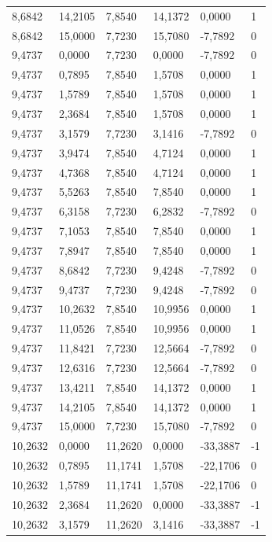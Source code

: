 \documentclass[12pt]{article}
\begin{document}
\begin{longtable}{@{}llllll@{}}
		8,6842  & 14,2105 & 7,8540  & 14,1372 & 0,0000   & 1  \\
		8,6842  & 15,0000 & 7,7230  & 15,7080 & -7,7892  & 0  \\
		9,4737  & 0,0000  & 7,7230  & 0,0000  & -7,7892  & 0  \\
		9,4737  & 0,7895  & 7,8540  & 1,5708  & 0,0000   & 1  \\
		9,4737  & 1,5789  & 7,8540  & 1,5708  & 0,0000   & 1  \\
		9,4737  & 2,3684  & 7,8540  & 1,5708  & 0,0000   & 1  \\
		9,4737  & 3,1579  & 7,7230  & 3,1416  & -7,7892  & 0  \\
		9,4737  & 3,9474  & 7,8540  & 4,7124  & 0,0000   & 1  \\
		9,4737  & 4,7368  & 7,8540  & 4,7124  & 0,0000   & 1  \\
		9,4737  & 5,5263  & 7,8540  & 7,8540  & 0,0000   & 1  \\
		9,4737  & 6,3158  & 7,7230  & 6,2832  & -7,7892  & 0  \\
		9,4737  & 7,1053  & 7,8540  & 7,8540  & 0,0000   & 1  \\
		9,4737  & 7,8947  & 7,8540  & 7,8540  & 0,0000   & 1  \\
		9,4737  & 8,6842  & 7,7230  & 9,4248  & -7,7892  & 0  \\
		9,4737  & 9,4737  & 7,7230  & 9,4248  & -7,7892  & 0  \\
		9,4737  & 10,2632 & 7,8540  & 10,9956 & 0,0000   & 1  \\
		9,4737  & 11,0526 & 7,8540  & 10,9956 & 0,0000   & 1  \\
		9,4737  & 11,8421 & 7,7230  & 12,5664 & -7,7892  & 0  \\
		9,4737  & 12,6316 & 7,7230  & 12,5664 & -7,7892  & 0  \\
		9,4737  & 13,4211 & 7,8540  & 14,1372 & 0,0000   & 1  \\
		9,4737  & 14,2105 & 7,8540  & 14,1372 & 0,0000   & 1  \\
		9,4737  & 15,0000 & 7,7230  & 15,7080 & -7,7892  & 0  \\
		10,2632 & 0,0000  & 11,2620 & 0,0000  & -33,3887 & -1 \\
		10,2632 & 0,7895  & 11,1741 & 1,5708  & -22,1706 & 0  \\
		10,2632 & 1,5789  & 11,1741 & 1,5708  & -22,1706 & 0  \\
		10,2632 & 2,3684  & 11,2620 & 0,0000  & -33,3887 & -1 \\
		10,2632 & 3,1579  & 11,2620 & 3,1416  & -33,3887 & -1 \\

\end{longtable}
\end{document}
